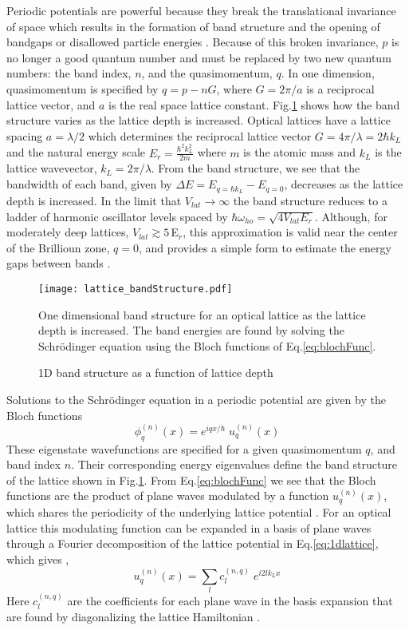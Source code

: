 Periodic potentials are powerful because they break the translational invariance of space which results in the formation of band structure and the opening of bandgaps or disallowed particle energies \cite{Ashcroft1976}.
Because of this broken invariance, $p$ is no longer a good quantum number and must be replaced by two new quantum numbers: the band index, $n$, and the quasimomentum, $q$.
In one dimension, quasimomentum is specified by $q = p - nG$, where $G=2\pi/a$ is a reciprocal lattice vector, and $a$ is the real space lattice constant.
Fig.\;\ref{fig:bandStructure} shows how the band structure varies as the lattice depth is increased.
Optical lattices have a lattice spacing $a = \lambda /2$ which determines the reciprocal lattice vector $G = 4\pi / \lambda = 2 \hbar k_L$ and the natural energy scale $E_r = \frac{\hbar^2 k_L^2}{2m}$ where $m$ is the atomic mass and $k_L$ is the lattice wavevector, $k_L = 2\pi / \lambda$.
From the band structure, we see that the bandwidth of each band, given by $\Delta E = E_{q=\hbar k_L} - E_{q=0}$, decreases as the lattice depth is increased.
In the limit that $V_{lat}\!\rightarrow\!\infty$ the band structure reduces to a ladder of harmonic oscillator levels spaced by $\hbar \omega_{ho} = \sqrt{4 V_{lat} E_r}$.
Although, for moderately deep lattices, $V_{lat} \gtrsim 5\,$E$_r$, this approximation is valid near the center of the Brillioun zone, $q = 0$, and provides a simple form to estimate the energy gaps between bands \cite{Jaksch1998,Jaksch2005}.
	\begin{figure} \label{fig:bandStructure}
		\centerline{
		\texttt{[image: lattice\_bandStructure.pdf]}}
		\caption{1D band structure as a function of lattice depth}{One dimensional band structure for an optical lattice as the lattice depth is increased. The band energies are found by solving the Schr\"{o}dinger equation using the Bloch functions of Eq.\;\ref{eq:blochFunc}.}
	\end{figure}
Solutions to the Schr\"{o}dinger equation in a periodic potential are given by the Bloch functions \cite{Ashcroft1976}
	\begin{equation} \label{eq:blochFunc}
		 \phi_q^{(n)}(x) = e^{iqx/ \hbar} \; u_q^{(n)}(x)
	\end{equation}
These eigenstate wavefunctions are specified for a given quasimomentum $q$, and band index $n$. 
Their corresponding energy eigenvalues define the band structure of the lattice shown in Fig.\;\ref{fig:bandStructure}.
From Eq.\;\ref{eq:blochFunc} we see that the Bloch functions are the product of plane waves modulated by a function $u_q^{(n)}(x)$, which shares the periodicity of the underlying lattice potential \cite{Ashcroft1976}.
For an optical lattice this modulating function can be expanded in a basis of plane waves through a Fourier decomposition of the lattice potential in Eq.\;\ref{eq:1dlattice}, which gives \cite{Greiner2003},
	\begin{equation} \label{eq:blochMod}
		 u_q^{(n)}(x) = \sum_l c_l^{(n,q)} \; e^{i2lk_Lx}
	\end{equation}
Here $c_l^{(n,q)}$ are the coefficients for each plane wave in the basis expansion that are found by diagonalizing the lattice Hamiltonian \cite{Greiner2003}.

